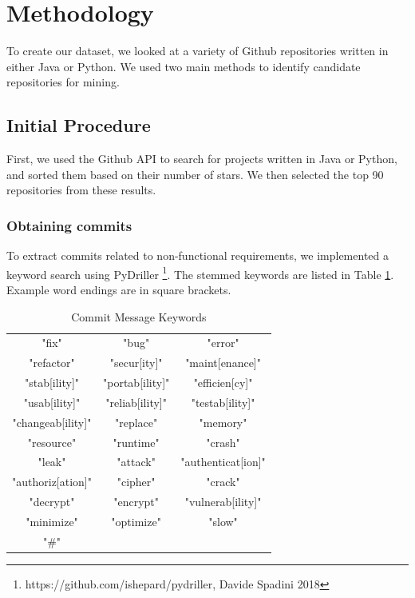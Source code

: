 \documentclass[sigconf]{acmart}
\begin{document}
\section{Methodology}
To create our dataset, we looked at a variety of Github repositories written in either Java or Python. 
We used two main methods to identify candidate repositories for mining. 
 
\subsection{Initial Procedure}
First, we used the Github API to search for projects written in Java or Python, and sorted them based on their number of stars. We then selected the top 90 repositories from these results. 

\subsubsection{Obtaining commits}
To extract commits related to non-functional requirements, we implemented a keyword search using PyDriller \footnote{https://github.com/ishepard/pydriller, Davide Spadini 2018}. The stemmed keywords are listed in Table \ref{tab:kwds}. Example word endings are in square brackets.

\begin{table}
  \caption{Commit Message Keywords}
  \label{tab:kwds}
\begin{tabular}{ c c c }
  \toprule
   "fix"             &"bug"           &"error"\\
   "refactor"	     &"secur[ity]"    &"maint[enance]"\\
   "stab[ility]"     &"portab[ility]" &"efficien[cy]"\\
   "usab[ility]"     &"reliab[ility]" &"testab[ility]"\\
   "changeab[ility]" &"replace"       &"memory"\\
   "resource"        &"runtime"       &"crash"\\
   "leak"            &"attack"        &"authenticat[ion]"\\
   "authoriz[ation]" &"cipher"        &"crack" \\ 
   "decrypt"         &"encrypt"       &"vulnerab[ility]"\\ 
   "minimize"        &"optimize"      &"slow"\\
   "\#"              &                &\\
  \bottomrule
\end{tabular}
\end{table}
\end{document}
